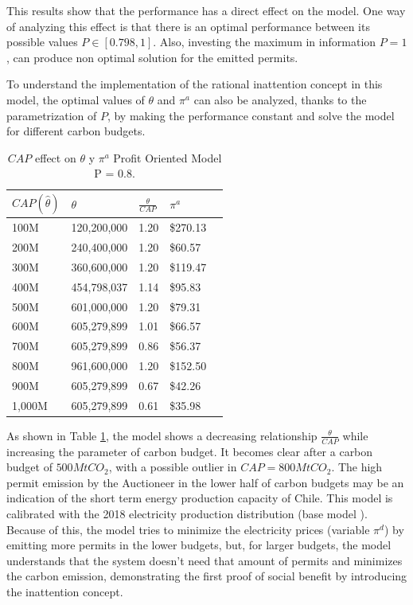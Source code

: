 \documentclass[a4paper,fleqn]{cas-dc}
\begin{document}
This results show that the performance has a direct effect on the model. One way of analyzing this effect is that there is an optimal performance between its possible values $P \in [0.798,1]$. Also, investing the maximum in information $P=1$, can produce non optimal solution for the emitted permits. 

To understand the implementation of the rational inattention concept in this model, the optimal values of $\theta$ and $\pi^a$ can also be analyzed, thanks to the parametrization of $P$, by making the performance constant and solve the model for different carbon budgets. 

\begin{table}[H]
    \caption{{\footnotesize $CAP$ effect on $\theta$ y $\pi^a$ Profit Oriented Model P = 0.8.}}
    \label{efectocapthetapia}
    \centering
    \begin{tabular}{ l l l l l }
    \hline
         $CAP(\hat{\theta})$ & $\theta$  & $\frac{\theta}{CAP}$  & $\pi^a$  \\ \hline
         100M & 120,200,000 & 1.20 &  \$270.13   \\ \hline
       200M & 240,400,000 & 1.20 &  \$60.57   \\ \hline
        300M & 360,600,000 & 1.20 &  \$119.47   \\ \hline
        400M & 454,798,037 & 1.14 &  \$95.83   \\ \hline
        500M & 601,000,000 & 1.20 &  \$79.31   \\ \hline
        600M & 605,279,899 & 1.01 &  \$66.57   \\ \hline
        700M & 605,279,899 & 0.86 &  \$56.37   \\ \hline
        800M & 961,600,000 & 1.20 &  \$152.50   \\ \hline
        900M & 605,279,899 & 0.67 &  \$42.26   \\ \hline
        1,000M & 605,279,899 & 0.61 &  \$35.98   \\ \hline
    \end{tabular}
\end{table}

As shown in Table \ref{efectocapthetapia}, the model shows a decreasing relationship $\frac{\theta}{CAP}$ while increasing the parameter of carbon budget. It becomes clear after a carbon budget of $500MtCO_2$, with a possible outlier in $CAP=800MtCO_2$. The high permit emission by the Auctioneer in the lower half of carbon budgets may be an indication of the short term energy production capacity of Chile. This model is calibrated with the 2018 electricity production distribution (base model \cite{amigo_two_2021}). Because of this, the model tries to minimize the electricity prices (variable $\pi^d$) by emitting more permits in the lower budgets, but, for larger budgets, the model understands that the system doesn't need that amount of permits and minimizes the carbon emission, demonstrating the first proof of social benefit by introducing the inattention concept.
\end{document}

